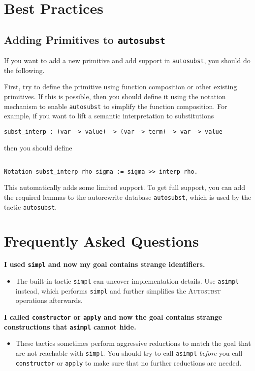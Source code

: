 \documentclass{scrartcl}
\newcommand{\faq}[2]{\vspace{\topsep}\noindent\textbf{#1}\\\vspace{-\topsep}\begin{itemize}[nolistsep]\item[]{#2}\end{itemize}}
\newcommand{\Autosubst}{\textsc{Autosubst}\xspace}
\newcommand{\lst}{\lstinline}
\begin{document}
\section{Best Practices}
\label{sec:best-practices}



\subsection{Adding Primitives to \lst$autosubst$}
\label{sec:adding-prim}

If you want to add a new primitive and add support in \lst$autosubst$, you should do the following.

First, try to define the primitive using function composition or other existing primitives.
If this is possible, then you should define it using the notation mechanism to enable \lst$autosubst$ to simplify the function composition.
For example, if you want to lift a semantic interpretation to substitutions 
\begin{lstlisting}
subst_interp : (var -> value) -> (var -> term) -> var -> value  
\end{lstlisting}
then you should define
\begin{lstlisting}

Notation subst_interp rho sigma := sigma >> interp rho.
\end{lstlisting}
This automatically adds some limited support. To get full support, you can add the required lemmas to the autorewrite database \lst$autosubst$, which is used by the tactic \lst$autosubst$.


\section{Frequently Asked Questions}
\label{sec:faq}

\faq{I used \lst$simpl$ and now my goal contains strange identifiers.}
{The built-in tactic \lst$simpl$ can uncover implementation details. Use \lst$asimpl$ instead, which performs \lst$simpl$ and further simplifies the \Autosubst operations afterwards.}

\faq{I called \lst$constructor$ or \lst$apply$ and now the goal contains strange constructions that \lst$asimpl$ cannot hide.}
{These tactics sometimes perform aggressive reductions to match the goal that are not reachable with \lst$simpl$. You should try to call \lst$asimpl$ \emph{before} you call \lst$constructor$ or \lst$apply$ to make sure that no further reductions are needed.
}



\end{document}
